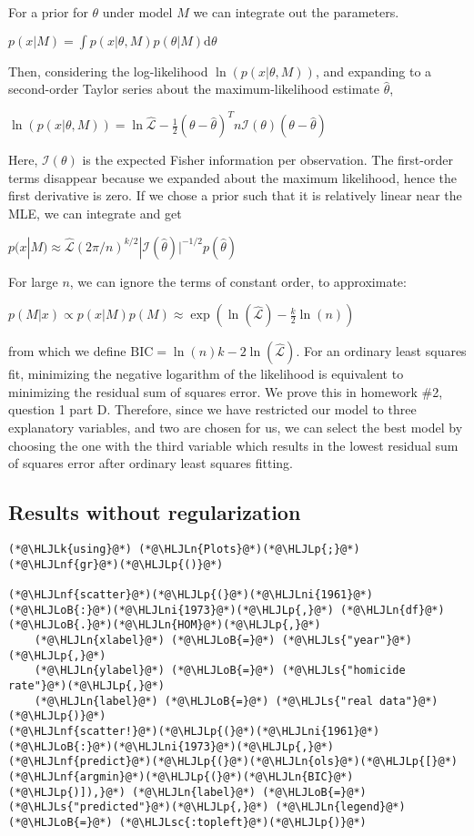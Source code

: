 \documentclass[12pt,a4paper]{article}
\newcommand{\HLJLk}[1]{\textcolor[RGB]{148,91,176}{\textbf{#1}}}
\newcommand{\HLJLn}[1]{#1}
\newcommand{\HLJLnf}[1]{\textcolor[RGB]{66,102,213}{#1}}
\newcommand{\HLJLs}[1]{\textcolor[RGB]{201,61,57}{#1}}
\newcommand{\HLJLsc}[1]{\textcolor[RGB]{201,61,57}{#1}}
\newcommand{\HLJLni}[1]{\textcolor[RGB]{59,151,46}{#1}}
\newcommand{\HLJLoB}[1]{\textcolor[RGB]{102,102,102}{\textbf{#1}}}
\newcommand{\HLJLp}[1]{#1}
\begin{document}
For a prior for $\theta$ under model $M$ we can integrate out the parameters.

$p(x | M) = \int p(x | \theta, M) p(\theta | M) \mathrm{d}\theta$

Then, considering the log-likelihood $\ln(p(x | \theta, M))$, and expanding to a second-order Taylor series about the maximum-likelihood estimate $\hat{\theta}$,

$\ln(p(x | \theta, M)) = \ln\hat{\mathcal{L}} - \frac{1}{2}(\theta - \hat{\theta})^T n \mathcal{I}(\theta) (\theta - \hat{\theta})$

Here, $\mathcal{I}(\theta)$ is the expected Fisher information per observation. The first-order terms disappear because we expanded about the maximum likelihood, hence the first derivative is zero. If we chose a prior such that it is relatively linear near the MLE, we can integrate and get

$p(x | M) \approx \hat{\mathcal{L}}(2\pi / n)^{k/2} | \mathcal{I}(\hat{\theta}) | ^{-1/2} p(\hat{\theta})$

For large $n$, we can ignore the terms of constant order, to approximate:

$p(M | x) \propto p(x | M) p(M) \approx \exp(\ln (\hat{\mathcal{L}}) - \frac{k}{2} \ln (n))$

from which we define $\mathrm{BIC} = \ln(n)k - 2 \ln(\hat{\mathcal{L}})$. For an ordinary least squares fit, minimizing the negative logarithm of the likelihood is equivalent to minimizing the residual sum of squares error. We prove this in homework \#2, question 1 part D. Therefore, since we have restricted our model to three explanatory variables, and two are chosen for us, we can select the best model by choosing the one with the third variable which results in the lowest residual sum of squares error after ordinary least squares fitting.


\subsection{Results without regularization}

\begin{lstlisting}
(*@\HLJLk{using}@*) (*@\HLJLn{Plots}@*)(*@\HLJLp{;}@*) (*@\HLJLnf{gr}@*)(*@\HLJLp{()}@*)

(*@\HLJLnf{scatter}@*)(*@\HLJLp{(}@*)(*@\HLJLni{1961}@*)(*@\HLJLoB{:}@*)(*@\HLJLni{1973}@*)(*@\HLJLp{,}@*) (*@\HLJLn{df}@*)(*@\HLJLoB{.}@*)(*@\HLJLn{HOM}@*)(*@\HLJLp{,}@*)
    (*@\HLJLn{xlabel}@*) (*@\HLJLoB{=}@*) (*@\HLJLs{"year"}@*)(*@\HLJLp{,}@*)
    (*@\HLJLn{ylabel}@*) (*@\HLJLoB{=}@*) (*@\HLJLs{"homicide rate"}@*)(*@\HLJLp{,}@*)
    (*@\HLJLn{label}@*) (*@\HLJLoB{=}@*) (*@\HLJLs{"real data"}@*)(*@\HLJLp{)}@*)
(*@\HLJLnf{scatter!}@*)(*@\HLJLp{(}@*)(*@\HLJLni{1961}@*)(*@\HLJLoB{:}@*)(*@\HLJLni{1973}@*)(*@\HLJLp{,}@*) (*@\HLJLnf{predict}@*)(*@\HLJLp{(}@*)(*@\HLJLn{ols}@*)(*@\HLJLp{[}@*)(*@\HLJLnf{argmin}@*)(*@\HLJLp{(}@*)(*@\HLJLn{BIC}@*)(*@\HLJLp{)]),}@*) (*@\HLJLn{label}@*) (*@\HLJLoB{=}@*) (*@\HLJLs{"predicted"}@*)(*@\HLJLp{,}@*) (*@\HLJLn{legend}@*) (*@\HLJLoB{=}@*) (*@\HLJLsc{:topleft}@*)(*@\HLJLp{)}@*)
\end{lstlisting}
\end{document}
